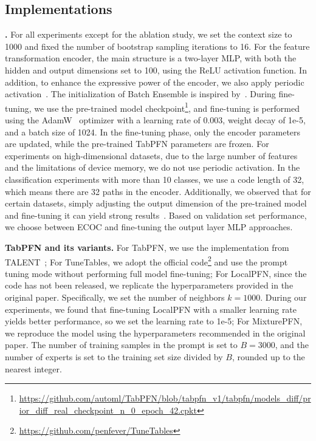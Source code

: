 \subsection{Implementations}
\textbf{\name.} For all experiments except for the ablation study, we set the context size to 1000 and fixed the number of bootstrap sampling iterations to 16. For the feature transformation encoder, the main structure is a two-layer MLP, with both the hidden and output dimensions set to 100, using the ReLU activation function. In addition, to enhance the expressive power of the encoder, we also apply periodic activation~\cite{Gorishniy2022On}. The initialization of Batch Ensemble is inspired by~\citet{Yury2024TabM}. During fine-tuning, we use the pre-trained model checkpoint\footnote{\href{https://github.com/automl/TabPFN/blob/tabpfn_v1/tabpfn/models_diff/prior_diff_real_checkpoint_n_0_epoch_42.cpkt}{https://github.com/automl/TabPFN/blob/tabpfn\_v1/tabpfn/models\_diff/prior\_diff\_real\_checkpoint\_n\_0\_epoch\_42.cpkt}}, and fine-tuning is performed using the AdamW~\cite{LoshchilovH19AdamW} optimizer with a learning rate of 0.003, weight decay of 1e-5, and a batch size of 1024. In the fine-tuning phase, only the encoder parameters are updated, while the pre-trained TabPFN parameters are frozen.  
For experiments on high-dimensional datasets, due to the large number of features and the limitations of device memory, we do not use periodic activation. In the classification experiments with more than 10 classes, we use a code length of 32, which means there are 32 paths in the encoder. Additionally, we observed that for certain datasets, simply adjusting the output dimension of the pre-trained model and fine-tuning it can yield strong results~\cite{TuneTables}. Based on validation set performance, we choose between  ECOC  and fine-tuning the output layer MLP approaches.

\textbf{TabPFN and its variants.} 
For TabPFN, we use the implementation from TALENT~\cite{TALENT}; For TuneTables, we adopt the official code\footnote{\href{https://github.com/penfever/TuneTables}{https://github.com/penfever/TuneTables}} and use the prompt tuning mode without performing full model fine-tuning; For LocalPFN, since the code has not been released, we replicate the hyperparameters provided in the original paper. Specifically, we set the number of neighbors \(k = 1000\). During our experiments, we found that fine-tuning LocalPFN with a smaller learning rate yields better performance, so we set the learning rate to 1e-5; For MixturePFN, we reproduce the model using the hyperparameters recommended in the original paper. The number of training samples in the prompt is set to \(B = 3000\), and the number of experts is set to the training set size divided by \(B\), rounded up to the nearest integer.

